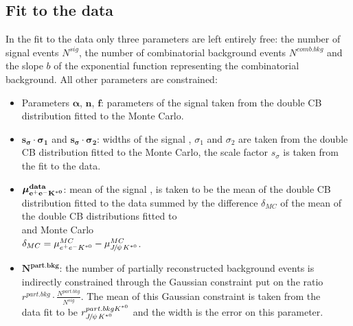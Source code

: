 \subsection{Fit to the \BdKstee \lhcb data}
In the fit to the \BdKstee \lhcb data only three parameters are left entirely free: the number of signal events $N^{sig}$, the number of combinatorial background events $N^{comb. bkg}$ and the slope $b$ of the exponential function representing the combinatorial background. All other parameters are constrained:
\begin{itemize}
\item Parameters $\boldsymbol{\alpha}$, $\mathbf{n}$, $\mathbf{f}$: parameters of the signal \PDF taken from the double CB distribution fitted to the \BdKstee Monte Carlo.
\item $\mathbf{s_{\boldsymbol{\sigma}}\cdot \boldsymbol{\sigma_1}}$ and $\mathbf{s_{\boldsymbol{\sigma}}\cdot \boldsymbol{\sigma}_2}$: widths of the signal \PDF, $\sigma_1$ and $\sigma_2$ are taken from the double CB distribution fitted to the \BdKstee Monte Carlo, the scale factor $s_{\sigma}$ is taken from the fit to the \BdToJPsieeKst \lhcb data.
\item $\mathbf{\boldsymbol{\mu}^{data}_{e^+e^- K^{*0}}}$: mean of the signal \PDF, is taken to be the mean of the double CB distribution fitted to the \BdToJPsieeKst \lhcb data summed by the difference $\delta_{MC}$ of the mean of the double CB distributions fitted to\\ \BdKstee and \BdToJPsieeKst Monte Carlo \\ $\delta_{MC} = \mu^{MC}_{e^+e^- K^{*0}} - \mu^{MC}_{{J\mskip -3mu/\mskip -2mu\psi\mskip 2mu} K^{*0}}$.
\item $\mathbf{N^{part. bkg}}$: the number of partially reconstructed background events is indirectly constrained through the Gaussian constraint put on the ratio $r^{part. bkg}\cdot \frac{N^{part. bkg}}{N^{sig}}$. The mean of this Gaussian constraint is taken from the\\ \BdToJPsieeKst \lhcb data fit to be $r^{part. bkg K^{*0}}_{{J\mskip -3mu/\mskip -2mu\psi\mskip 2mu} K^{*0}}$ and the width is the error on this parameter.\\
\end{itemize}

